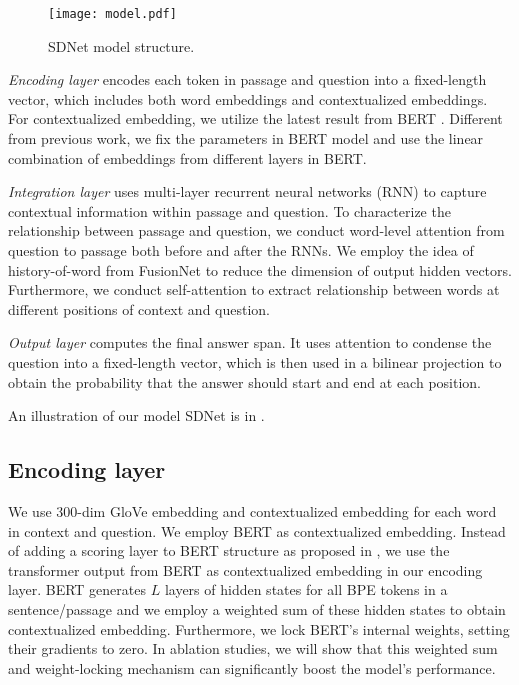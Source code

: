 \documentclass{article} \usepackage{sdnet,times}
\begin{document}
\begin{figure*}[t]
\hspace*{-1.25cm}
\texttt{[image: model.pdf]}
\vspace{-5\baselineskip}
\caption{SDNet model structure.}
\label{fig:model}
\end{figure*}

\textit{Encoding layer} encodes each token in passage and question into a fixed-length vector, which includes both word embeddings and contextualized embeddings. For contextualized embedding, we utilize the latest result from BERT \citep{bert}. Different from previous work, we fix the parameters in BERT model and use the linear combination of embeddings from different layers in BERT.

\textit{Integration layer} uses multi-layer recurrent neural networks (RNN) to capture contextual information within passage and question. To characterize the relationship between passage and question, we conduct word-level attention from question to passage both before and after the RNNs. We employ the idea of history-of-word from FusionNet \citep{fusionnet} to reduce the dimension of output hidden vectors. Furthermore, we conduct self-attention to extract relationship between words at different positions of context and question.

\textit{Output layer} computes the final answer span. It uses attention to condense the question into a fixed-length vector, which is then used in a bilinear projection to obtain the probability that the answer should start and end at each position. 

An illustration of our model SDNet is in .

\subsection{Encoding layer} 
We use 300-dim GloVe \citep{pennington2014glove} embedding and contextualized embedding for each word in context and question. We employ BERT \citep{bert} as contextualized embedding. Instead of adding a scoring layer to BERT structure as proposed in \citep{bert}, we use the transformer output from BERT as contextualized embedding in our encoding layer. BERT generates $L$ layers of hidden states for all BPE tokens \citep{bpe} in a sentence/passage and we employ a weighted sum of these hidden states to obtain contextualized embedding. Furthermore, we lock BERT's internal weights, setting their gradients to zero. In ablation studies, we will show that this weighted sum and weight-locking mechanism can significantly boost the model's performance.
\end{document}
